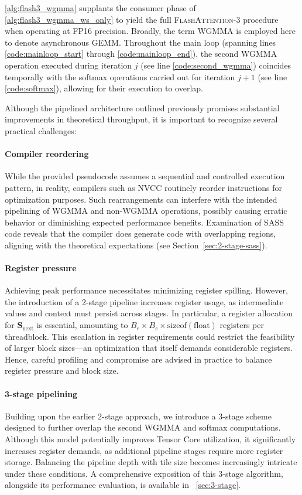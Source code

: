 \begin{enumerate}
\begin{algorithm}[H]
\begin{algorithmic}[1]
\cref{alg:flash3_wgmma} supplants the consumer phase of \cref{alg:flash3_wgmma_ws_only} to yield the full \textsc{FlashAttention-3} procedure when operating at FP16 precision. Broadly, the term WGMMA is employed here to denote asynchronous GEMM. Throughout the main loop (spanning lines \ref{code:mainloop_start} through \ref{code:mainloop_end}), the second WGMMA operation executed during iteration $j$ (see line \ref{code:second_wgmma}) coincides temporally with the softmax operations carried out for iteration $j+1$ (see line \ref{code:softmax}), allowing for their execution to overlap.

Although the pipelined architecture outlined previously promises substantial improvements in theoretical throughput, it is important to recognize several practical challenges:

\paragraph{Compiler reordering} While the provided pseudocode assumes a sequential and controlled execution pattern, in reality, compilers such as NVCC routinely reorder instructions for optimization purposes. Such rearrangements can interfere with the intended pipelining of WGMMA and non-WGMMA operations, possibly causing erratic behavior or diminishing expected performance benefits. Examination of SASS code reveals that the compiler does generate code with overlapping regions, aligning with the theoretical expectations (see Section~\ref{sec:2-stage-sass}).

\paragraph{Register pressure} Achieving peak performance necessitates minimizing register spilling. However, the introduction of a 2-stage pipeline increases register usage, as intermediate values and context must persist across stages. In particular, a register allocation for $\mathbf{S}_{\mathrm{next}}$ is essential, amounting to $B_r \times B_c \times \text{sizeof}(\text{float})$ registers per threadblock. This escalation in register requirements could restrict the feasibility of larger block sizes—an optimization that itself demands considerable registers. Hence, careful profiling and compromise are advised in practice to balance register pressure and block size.

\paragraph{3-stage pipelining} Building upon the earlier 2-stage approach, we introduce a 3-stage scheme designed to further overlap the second WGMMA and softmax computations. Although this model potentially improves Tensor Core utilization, it significantly increases register demands, as additional pipeline stages require more register storage. Balancing the pipeline depth with tile size becomes increasingly intricate under these conditions. A comprehensive exposition of this 3-stage algorithm, alongside its performance evaluation, is available in ~\cref{sec:3-stage}.


\end{algorithmic}
\end{algorithm}
\end{enumerate}
